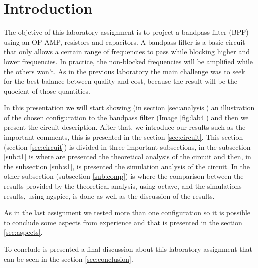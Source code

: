 \newpage
\section{Introduction}
\label{sec:introduction}



The objetive of this laboratory assignment is to project a bandpass filter (BPF) using an OP-AMP, resistors and capacitors.
A bandpass filter is a basic circuit that only allows a certain range of frequencies to pass while blocking higher and lower frequencies.
In practice, the non-blocked frequencies will be amplified while the others won't.
As in the previous laboratory the main challenge was to seek for the best balance between quality and cost, because the result will be the quocient of those quantities.

In this presentation we will start showing (in section \ref{sec:analysis}) an illustration of the chosen configuration to the bandpass filter (Image \ref{fig:lab4}) and
then we present the circuit description. 
After that, we introduce our results such as the important comments, this is presented in the section \ref{sec:circuit}. This section (section \ref{sec:circuit}) is divided 
in three important subsections, 
in the subsection \ref{sub:t1} is where are presented the theoretical analysis of the circuit and then, in the subsection \ref{sub:s1}, is presented the simulation analysis
 of the circuit. In the other subsection (subsection \ref{sub:comp}) is where the comparison between the results provided by the theoretical analysis, using octave, and 
the simulations results, using ngspice, is done as well as the discussion of the results.

As in the last assignment we tested more than one configuration so it is possible to conclude some aspects from experience and that is presented in the section 
\ref{sec:aspects}.

To conclude is presented a final discussion about this laboratory assignment that can be seen in the section \ref{sec:conclusion}.






